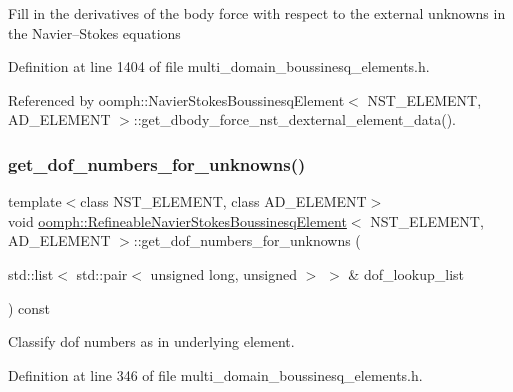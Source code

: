 Fill in the derivatives of the body force with respect to the external unknowns in the Navier--Stokes equations 

Definition at line 1404 of file multi\+\_\+domain\+\_\+boussinesq\+\_\+elements.\+h.



Referenced by oomph\+::\+Navier\+Stokes\+Boussinesq\+Element$<$ N\+S\+T\+\_\+\+E\+L\+E\+M\+E\+N\+T, A\+D\+\_\+\+E\+L\+E\+M\+E\+N\+T $>$\+::get\+\_\+dbody\+\_\+force\+\_\+nst\+\_\+dexternal\+\_\+element\+\_\+data().

\mbox{\label{classoomph_1_1RefineableNavierStokesBoussinesqElement_aab581709145cc3e9a4da5c5417d1c50f}} 
\subsubsection{\texorpdfstring{get\+\_\+dof\+\_\+numbers\+\_\+for\+\_\+unknowns()}{get\_dof\_numbers\_for\_unknowns()}}
{\footnotesize\ttfamily template$<$class N\+S\+T\+\_\+\+E\+L\+E\+M\+E\+NT, class A\+D\+\_\+\+E\+L\+E\+M\+E\+NT$>$ \\
void \hyperlink{classoomph_1_1RefineableNavierStokesBoussinesqElement}{oomph\+::\+Refineable\+Navier\+Stokes\+Boussinesq\+Element}$<$ N\+S\+T\+\_\+\+E\+L\+E\+M\+E\+NT, A\+D\+\_\+\+E\+L\+E\+M\+E\+NT $>$\+::get\+\_\+dof\+\_\+numbers\+\_\+for\+\_\+unknowns (\begin{DoxyParamCaption}\item[{std\+::list$<$ std\+::pair$<$ unsigned long, unsigned $>$ $>$ \&}]{dof\+\_\+lookup\+\_\+list }\end{DoxyParamCaption}) const\hspace{0.3cm}{\ttfamily [inline]}}



Classify dof numbers as in underlying element. 



Definition at line 346 of file multi\+\_\+domain\+\_\+boussinesq\+\_\+elements.\+h.


